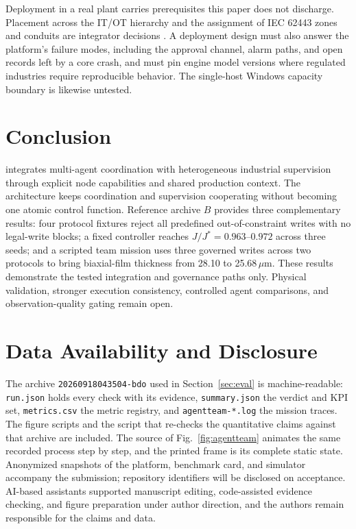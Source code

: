 Deployment in a real plant carries prerequisites this paper does not discharge.
Placement across the IT/OT hierarchy and the assignment of IEC 62443 zones and
conduits are integrator decisions \cite{iec62443}. A deployment design must also
answer the platform's failure modes, including the approval channel, alarm paths,
and open records left by a core crash, and must pin engine model versions where
regulated industries require reproducible behavior. The single-host Windows
capacity boundary is likewise untested.

\section{Conclusion}
\label{sec:conclusion}
\system{} integrates multi-agent coordination with heterogeneous industrial
supervision through explicit node capabilities and shared production context. The
architecture keeps coordination and supervision cooperating without becoming one atomic control
function. Reference archive $B$ provides three
complementary results: four protocol fixtures reject all predefined
out-of-constraint writes with no legal-write blocks; a fixed controller reaches
$J/J^*=0.963$--$0.972$ across three seeds; and a scripted team mission uses three
governed writes across two protocols to bring biaxial-film thickness from 28.10 to
25.68\,$\mu$m. These results demonstrate the tested integration and governance
paths only. Physical validation, stronger execution consistency, controlled agent comparisons,
and observation-quality gating remain open.

\section*{Data Availability and Disclosure}
The archive \texttt{20260918043504-bdo} used in Section~\ref{sec:eval} is
machine-readable: \texttt{run.json} holds every check with its evidence,
\texttt{summary.json} the verdict and KPI set, \texttt{metrics.csv} the metric
registry, and \texttt{agentteam-*.log} the mission traces. The figure scripts and
the script that re-checks the quantitative claims against that archive are
included. The source of Fig.~\ref{fig:agentteam} animates the same recorded process step by
step, and the printed frame is its complete static state. Anonymized snapshots of
the platform, benchmark card, and simulator accompany the submission; repository
identifiers will be disclosed on acceptance. AI-based assistants supported
manuscript editing, code-assisted evidence checking, and figure preparation under
author direction, and the authors remain responsible for the claims and data.
